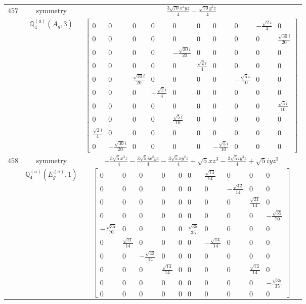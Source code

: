 \documentclass[fleqn,8pt,landscape]{jsarticle}
\begin{document}
\begin{longtable}{ccc}
$ 457 $ & $ \text{symmetry} $ & $ \frac{3 \sqrt{70} x^{2} y z}{4} - \frac{\sqrt{70} y^{3} z}{4} $ \\
$  $ & $ \mathbb{Q}_{4}^{(a)}(A_{g},3) $ & $ \begin{bmatrix} 0 & 0 & 0 & 0 & 0 & 0 & 0 & 0 & - \frac{\sqrt{2} i}{4} & 0 \\ 0 & 0 & 0 & 0 & 0 & 0 & 0 & 0 & 0 & \frac{\sqrt{30} i}{20} \\ 0 & 0 & 0 & 0 & - \frac{\sqrt{30} i}{20} & 0 & 0 & 0 & 0 & 0 \\ 0 & 0 & 0 & 0 & 0 & \frac{\sqrt{2} i}{4} & 0 & 0 & 0 & 0 \\ 0 & 0 & \frac{\sqrt{30} i}{20} & 0 & 0 & 0 & 0 & - \frac{\sqrt{5} i}{10} & 0 & 0 \\ 0 & 0 & 0 & - \frac{\sqrt{2} i}{4} & 0 & 0 & 0 & 0 & 0 & 0 \\ 0 & 0 & 0 & 0 & 0 & 0 & 0 & 0 & 0 & \frac{\sqrt{5} i}{10} \\ 0 & 0 & 0 & 0 & \frac{\sqrt{5} i}{10} & 0 & 0 & 0 & 0 & 0 \\ \frac{\sqrt{2} i}{4} & 0 & 0 & 0 & 0 & 0 & 0 & 0 & 0 & 0 \\ 0 & - \frac{\sqrt{30} i}{20} & 0 & 0 & 0 & 0 & - \frac{\sqrt{5} i}{10} & 0 & 0 & 0 \end{bmatrix} $ \\ \hline
$ 458 $ & $ \text{symmetry} $ & $ - \frac{3 \sqrt{5} x^{3} z}{4} - \frac{3 \sqrt{5} i x^{2} y z}{4} - \frac{3 \sqrt{5} x y^{2} z}{4} + \sqrt{5} x z^{3} - \frac{3 \sqrt{5} i y^{3} z}{4} + \sqrt{5} i y z^{3} $ \\
$  $ & $ \mathbb{Q}_{4}^{(a)}(E_{g}^{(a)},1) $ & $ \begin{bmatrix} 0 & 0 & 0 & 0 & 0 & 0 & \frac{\sqrt{14}}{14} & 0 & 0 & 0 \\ 0 & 0 & 0 & 0 & 0 & 0 & 0 & - \frac{\sqrt{42}}{14} & 0 & 0 \\ 0 & 0 & 0 & 0 & 0 & 0 & 0 & 0 & \frac{\sqrt{21}}{14} & 0 \\ 0 & 0 & 0 & 0 & 0 & 0 & 0 & 0 & 0 & - \frac{\sqrt{35}}{70} \\ - \frac{\sqrt{35}}{70} & 0 & 0 & 0 & 0 & \frac{\sqrt{35}}{35} & 0 & 0 & 0 & 0 \\ 0 & \frac{\sqrt{21}}{14} & 0 & 0 & 0 & 0 & - \frac{\sqrt{14}}{14} & 0 & 0 & 0 \\ 0 & 0 & - \frac{\sqrt{42}}{14} & 0 & 0 & 0 & 0 & 0 & 0 & 0 \\ 0 & 0 & 0 & \frac{\sqrt{14}}{14} & 0 & 0 & 0 & 0 & \frac{\sqrt{14}}{14} & 0 \\ 0 & 0 & 0 & 0 & 0 & 0 & 0 & 0 & 0 & - \frac{\sqrt{35}}{35} \\ 0 & 0 & 0 & 0 & 0 & 0 & 0 & 0 & 0 & 0 \end{bmatrix} $ \\ \hline

\end{longtable}
\end{document}

